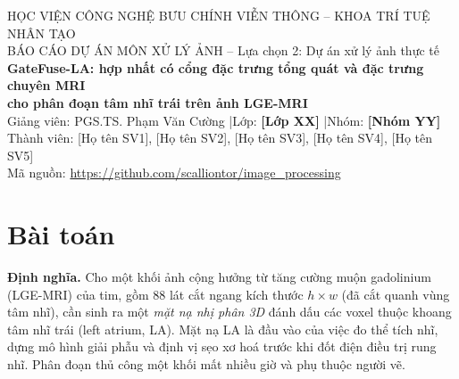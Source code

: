 \documentclass[11pt,a4paper]{article}
\begin{document}
\begin{center}
{\small HỌC VIỆN CÔNG NGHỆ BƯU CHÍNH VIỄN THÔNG -- KHOA TRÍ TUỆ NHÂN TẠO}\\[2pt]
{\small BÁO CÁO DỰ ÁN MÔN XỬ LÝ ẢNH -- Lựa chọn 2: Dự án xử lý ảnh thực tế}\\[8pt]
{\Large\bfseries\color{ptitred} GateFuse-LA: hợp nhất có cổng đặc trưng tổng quát và đặc trưng chuyên MRI\\[2pt] cho phân đoạn tâm nhĩ trái trên ảnh LGE-MRI}\\[8pt]
{\small Giảng viên: PGS.TS. Phạm Văn Cường \quad|\quad Lớp: \textbf{[Lớp XX]} \quad|\quad Nhóm: \textbf{[Nhóm YY]}}\\[2pt]
{\small Thành viên: [Họ tên SV1], [Họ tên SV2], [Họ tên SV3], [Họ tên SV4], [Họ tên SV5]}\\[2pt]
{\small Mã nguồn: \url{https://github.com/scalliontor/image_processing}}
\end{center}

\begin{abstract}
\noindent
Dự án xây dựng một pipeline xử lý ảnh nhiều bước để phân đoạn khoang tâm nhĩ trái trên ảnh LGE-MRI 3D. Pipeline kết hợp các kỹ thuật cổ điển của học phần (kéo giãn tương phản, lọc Gauss, phân ngưỡng Otsu, toán tử Sobel, phép mở/đóng, thành phần liên thông) với hai mô hình nền tảng được giữ đông cứng: DINOv3 (học trên ảnh tự nhiên) và MRI-CORE (học trên ảnh MRI). Chúng tôi đề xuất \textbf{GateFuse}, một đầu nhẹ (\ParamsGate\,M tham số) học \emph{cổng theo từng điểm ảnh} để ghép hai loại đặc trưng, và biến thể \textbf{D+} có thêm nhánh biên Sobel. Trên 20 khối test của 2018 Atrial Segmentation Challenge (3 seed), với 72 khối huấn luyện D+ đạt Dice \DiceGateEdgeFull{} (\DicePpGateEdgeFull{} sau hậu xử lý), ngang U-Net học từ đầu (\DiceUnetFull) và vượt xa pipeline cổ điển thuần (\DiceClassicalFull). Khi chỉ có 8 khối có nhãn, các đầu dùng đặc trưng nền tảng vượt U-Net khoảng 3 điểm Dice (D+ \DiceGateEdgeFew{} so với \DiceUnetFew, $p\PGateEdgeVsUnetFew$). Đặc trưng chuyên MRI tốt hơn đặc trưng tổng quát, ghép hai loại tốt hơn từng loại riêng, và bản đồ cổng cho thấy mô hình dựa vào MRI-CORE bên trong tâm nhĩ ($g=\GateInside$), dựa vào DINOv3 ở vùng ngữ cảnh ($g=\GateFar$). Hậu xử lý hình thái giảm HD95 từ 17\% đến 36\%.
\end{abstract}

\section{Bài toán}
\textbf{Định nghĩa.} Cho một khối ảnh cộng hưởng từ tăng cường muộn gadolinium (LGE-MRI) của tim, gồm 88 lát cắt ngang kích thước $h\times w$ (đã cắt quanh vùng tâm nhĩ), cần sinh ra một \emph{mặt nạ nhị phân 3D} đánh dấu các voxel thuộc khoang tâm nhĩ trái (left atrium, LA). Mặt nạ LA là đầu vào của việc đo thể tích nhĩ, dựng mô hình giải phẫu và định vị sẹo xơ hoá trước khi đốt điện điều trị rung nhĩ. Phân đoạn thủ công một khối mất nhiều giờ và phụ thuộc người vẽ.
\end{document}
